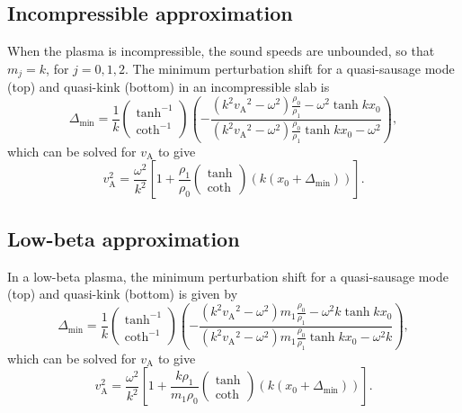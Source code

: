 \subsection{Incompressible approximation} \label{sec: mps incomp}
When the plasma is incompressible, the sound speeds are unbounded, so that $m_j = k$, for $j = 0, 1, 2$. The minimum perturbation shift for a quasi-sausage mode (top) and quasi-kink (bottom) in an incompressible slab is
\begin{equation}
\Delta_\textrm{min} = \frac{1}{k}\left(\begin{matrix} \tanh^{-1} \\ \coth^{-1} \end{matrix}\right)\left(-\frac{(k^2{v_\textrm{A}}^2-\omega^2)\frac{\rho_0}{\rho_1} - \omega^2\tanh{kx_0}}{(k^2{v_\textrm{A}}^2-\omega^2)\frac{\rho_0}{\rho_1}\tanh{kx_0} - \omega^2}\right),
\end{equation}
which can be solved for $v_\textrm{A}$ to give
\begin{equation}
v_\textrm{A}^2 = \frac{\omega^2}{k^2}\left[1 + \frac{\rho_1}{\rho_0}\left(\begin{matrix} \tanh \\ \coth \end{matrix}\right)(k(x_0 + \Delta_\textrm{min}))\right].
\end{equation}


\subsection{Low-beta approximation} \label{sec: mps low-beta}
In a low-beta plasma, the minimum perturbation shift for a quasi-sausage mode (top) and quasi-kink (bottom) is given by
\begin{equation}
\Delta_\textrm{min} = \frac{1}{k}\left(\begin{matrix} \tanh^{-1} \\ \coth^{-1} \end{matrix}\right)\left(-\frac{(k^2{v_\textrm{A}}^2 - \omega^2)m_1\frac{\rho_0}{\rho_1} - \omega^2k\tanh{kx_0}}{(k^2{v_\textrm{A}}^2 - \omega^2)m_1\frac{\rho_0}{\rho_1}\tanh{kx_0} - \omega^2k}\right),
\end{equation}
which can be solved for $v_\textrm{A}$ to give
\begin{equation}
v_\textrm{A}^2 = \frac{\omega^2}{k^2}\left[1 + \frac{k\rho_1}{m_1\rho_0}\left(\begin{matrix} \tanh \\ \coth \end{matrix}\right)(k(x_0 + \Delta_\textrm{min}))\right].
\end{equation}


